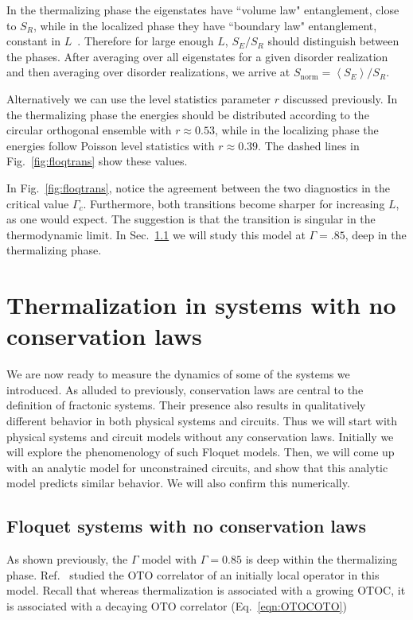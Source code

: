 \documentclass[a4paper,11pt]{article}
\newcommand{\ex}[1]{\left\langle #1 \right\rangle}
\begin{document}
In the thermalizing phase the eigenstates have ``volume law" entanglement, close to $S_R$, while in the localized phase they have ``boundary law" entanglement, constant in $L$~\cite{ZhangFloq}. Therefore for large enough $L$, $S_E/S_R$ should distinguish between the phases. After averaging over all eigenstates for a given disorder realization and then averaging over disorder realizations, we arrive at $S_\text{norm} = \ex{S_E}/S_R$.

Alternatively we can use the level statistics parameter $r$ discussed previously. In the thermalizing phase the energies should be distributed according to the circular orthogonal ensemble with $r \approx 0.53$, while in the localizing phase the energies follow Poisson level statistics with $r\approx 0.39$. The dashed lines in Fig.~\ref{fig:floqtrans} show these values.

In Fig.~\ref{fig:floqtrans}, notice the agreement between the two diagnostics in the critical value $\Gamma_c$. Furthermore, both transitions become sharper for increasing $L$, as one would expect. The suggestion is that the transition is singular in the thermodynamic limit. In Sec.~\ref{sub:fncons} we will study this model at $\Gamma=.85$, deep in the thermalizing phase.


\section{Thermalization in systems with no conservation laws} \label{sec:ncons}

We are now ready to measure the dynamics of some of the systems we introduced. As alluded to previously, conservation laws are central to the definition of fractonic systems. Their presence also results in qualitatively different behavior in both physical systems and circuits. Thus we will start with physical systems and circuit models without any conservation laws. Initially we will explore the phenomenology of such Floquet models. Then, we will come up with an analytic model for unconstrained circuits, and show that this analytic model predicts similar behavior. We will also confirm this numerically.

\subsection{Floquet systems with no conservation laws} \label{sub:fncons}

As shown previously, the $\Gamma$ model with $\Gamma=0.85$ is deep within the thermalizing phase. Ref.~\cite{ChenOtoc} studied the OTO correlator of an initially local operator in this model. Recall that whereas thermalization is associated with a growing OTOC, it is associated with a decaying OTO correlator (Eq.~\ref{eqn:OTOCOTO})
\end{document}
